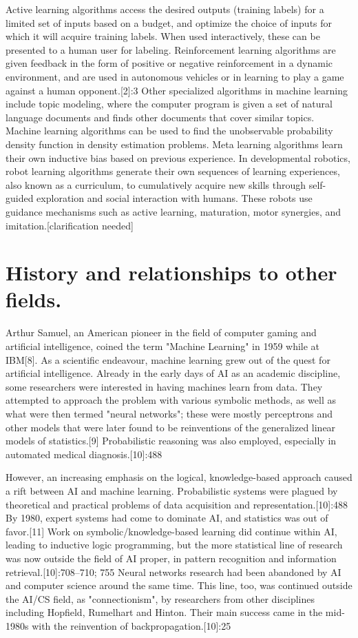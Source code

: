 \documentclass[utf8,bachelor,english]{gradu3}
\begin{document}
Active learning algorithms access the desired outputs (training labels) for a limited set of inputs based on a budget, and optimize the choice of inputs for which it will acquire training labels. When used interactively, these can be presented to a human user for labeling. Reinforcement learning algorithms are given feedback in the form of positive or negative reinforcement in a dynamic environment, and are used in autonomous vehicles or in learning to play a game against a human opponent.[2]:3 Other specialized algorithms in machine learning include topic modeling, where the computer program is given a set of natural language documents and finds other documents that cover similar topics. Machine learning algorithms can be used to find the unobservable probability density function in density estimation problems. Meta learning algorithms learn their own inductive bias based on previous experience. In developmental robotics, robot learning algorithms generate their own sequences of learning experiences, also known as a curriculum, to cumulatively acquire new skills through self-guided exploration and social interaction with humans. These robots use guidance mechanisms such as active learning, maturation, motor synergies, and imitation.[clarification needed]


\chapter{History and relationships to other fields.}

Arthur Samuel, an American pioneer in the field of computer gaming and artificial intelligence, coined the term "Machine Learning" in 1959 while at IBM[8]. As a scientific endeavour, machine learning grew out of the quest for artificial intelligence. Already in the early days of AI as an academic discipline, some researchers were interested in having machines learn from data. They attempted to approach the problem with various symbolic methods, as well as what were then termed "neural networks"; these were mostly perceptrons and other models that were later found to be reinventions of the generalized linear models of statistics.[9] Probabilistic reasoning was also employed, especially in automated medical diagnosis.[10]:488

However, an increasing emphasis on the logical, knowledge-based approach caused a rift between AI and machine learning. Probabilistic systems were plagued by theoretical and practical problems of data acquisition and representation.[10]:488 By 1980, expert systems had come to dominate AI, and statistics was out of favor.[11] Work on symbolic/knowledge-based learning did continue within AI, leading to inductive logic programming, but the more statistical line of research was now outside the field of AI proper, in pattern recognition and information retrieval.[10]:708–710; 755 Neural networks research had been abandoned by AI and computer science around the same time. This line, too, was continued outside the AI/CS field, as "connectionism", by researchers from other disciplines including Hopfield, Rumelhart and Hinton. Their main success came in the mid-1980s with the reinvention of backpropagation.[10]:25
\end{document}
